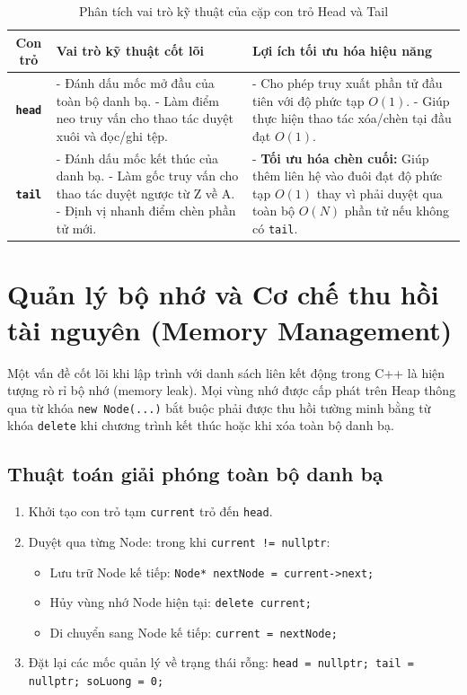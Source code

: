 \begin{table}[htbp]
\centering
\caption{Phân tích vai trò kỹ thuật của cặp con trỏ Head và Tail}
\label{tab:vai_tro_head_tail}
\begin{tabular}{|c|p{4.5cm}|p{6cm}|}
\hline
\textbf{Con trỏ} & \textbf{Vai trò kỹ thuật cốt lõi} & \textbf{Lợi ích tối ưu hóa hiệu năng} \\ \hline
\textbf{\texttt{head}} & 
- Đánh dấu mốc mở đầu của toàn bộ danh bạ.\newline
- Làm điểm neo truy vấn cho thao tác duyệt xuôi và đọc/ghi tệp. &
- Cho phép truy xuất phần tử đầu tiên với độ phức tạp $O(1)$.\newline
- Giúp thực hiện thao tác xóa/chèn tại đầu đạt $O(1)$. \\ \hline
\textbf{\texttt{tail}} & 
- Đánh dấu mốc kết thúc của danh bạ.\newline
- Làm gốc truy vấn cho thao tác duyệt ngược từ Z về A.\newline
- Định vị nhanh điểm chèn phần tử mới. &
- \textbf{Tối ưu hóa chèn cuối:} Giúp thêm liên hệ vào đuôi đạt độ phức tạp $O(1)$ thay vì phải duyệt qua toàn bộ $O(N)$ phần tử nếu không có \texttt{tail}. \\ \hline
\end{tabular}
\end{table}

\section{Quản lý bộ nhớ và Cơ chế thu hồi tài nguyên (Memory Management)}
Một vấn đề cốt lõi khi lập trình với danh sách liên kết động trong C++ là hiện tượng rò rỉ bộ nhớ (memory leak). Mọi vùng nhớ được cấp phát trên Heap thông qua từ khóa \texttt{new Node(...)} bắt buộc phải được thu hồi tường minh bằng từ khóa \texttt{delete} khi chương trình kết thúc hoặc khi xóa toàn bộ danh bạ.

\subsection{Thuật toán giải phóng toàn bộ danh bạ}
\begin{enumerate}
    \item Khởi tạo con trỏ tạm \texttt{current} trỏ đến \texttt{head}.
    \item Duyệt qua từng Node: trong khi \texttt{current != nullptr}:
    \begin{itemize}
        \item Lưu trữ Node kế tiếp: \texttt{Node* nextNode = current->next;}
        \item Hủy vùng nhớ Node hiện tại: \texttt{delete current;}
        \item Di chuyển sang Node kế tiếp: \texttt{current = nextNode;}
    \end{itemize}
    \item Đặt lại các mốc quản lý về trạng thái rỗng: \texttt{head = nullptr; tail = nullptr; soLuong = 0;}
\end{enumerate}

